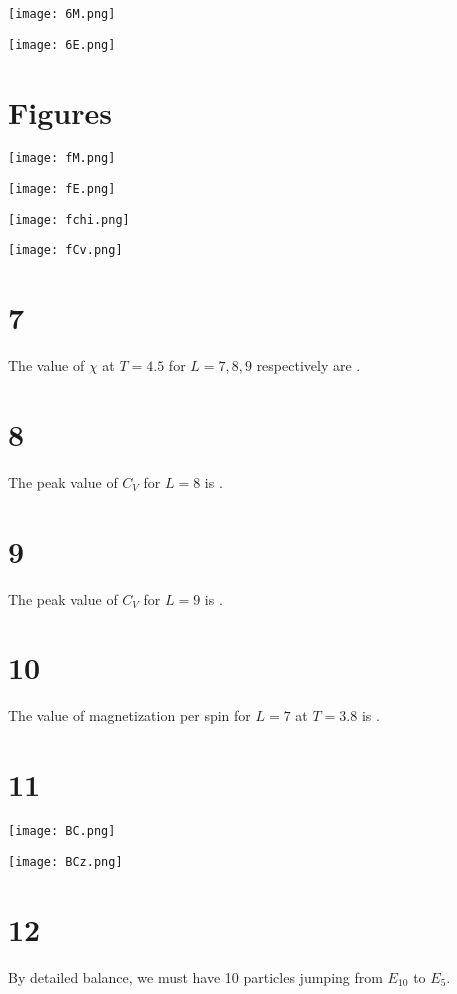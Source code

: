 \documentclass{article}
\begin{document}
\begin{center}
    \texttt{[image: 6M.png]}
\end{center}

\begin{center}
    \texttt{[image: 6E.png]}
\end{center}

\section*{Figures}

\begin{center}
    \texttt{[image: fM.png]}
\end{center}

\begin{center}
    \texttt{[image: fE.png]}
\end{center}

\begin{center}
    \texttt{[image: fchi.png]}
\end{center}

\begin{center}
    \texttt{[image: fCv.png]}
\end{center}

\section*{7}

The value of $\chi$ at $T=4.5$ for $L=7, 8, 9$ respectively are .

\section*{8}

The peak value of $C_V$ for $L = 8$ is .

\section*{9}

The peak value of $C_V$ for $L = 9$ is .

\section*{10}

The value of magnetization per spin for $L=7$ at $T=3.8$ is .

\section*{11}

\begin{center}
    \texttt{[image: BC.png]}
\end{center}

\begin{center}
    \texttt{[image: BCz.png]}
\end{center}

\section*{12}

By detailed balance, we must have 10 particles jumping from $E_{10}$ to $E_5$.
\end{document}
